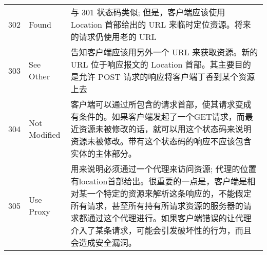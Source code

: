 \begin{longtable}[]{@{}cll@{}}
\begin{minipage}[t]{0.32\columnwidth}
302\strut
\end{minipage} & \begin{minipage}[t]{0.30\columnwidth}\raggedright\strut
Found\strut
\end{minipage} & \begin{minipage}[t]{0.30\columnwidth}\raggedright\strut
与 301 状态码类似; 但是，客户端应该使用 Location 首部给出的 URL
来临时定位资源。将来的请求仍使用老的 URL\strut
\end{minipage}\tabularnewline
\begin{minipage}[t]{0.32\columnwidth}\centering\strut
303\strut
\end{minipage} & \begin{minipage}[t]{0.30\columnwidth}\raggedright\strut
See Other\strut
\end{minipage} & \begin{minipage}[t]{0.30\columnwidth}\raggedright\strut
告知客户端应该用另外一个 URL 来获取资源。新的 URL 位于响应报文的
Location 首部。其主要目的是允许 POST
请求的响应将客户端丁香到某个资源上去\strut
\end{minipage}\tabularnewline
\begin{minipage}[t]{0.32\columnwidth}\centering\strut
304\strut
\end{minipage} & \begin{minipage}[t]{0.30\columnwidth}\raggedright\strut
Not Modified\strut
\end{minipage} & \begin{minipage}[t]{0.30\columnwidth}\raggedright\strut
客户端可以通过所包含的请求首部，使其请求变成有条件的。如果客户端发起了一个GET请求，而最近资源未被修改的话，就可以用这个状态码来说明资源未被修改。带有这个状态码的响应不应该包含实体的主体部分。\strut
\end{minipage}\tabularnewline
\begin{minipage}[t]{0.32\columnwidth}\centering\strut
305\strut
\end{minipage} & \begin{minipage}[t]{0.30\columnwidth}\raggedright\strut
Use Proxy\strut
\end{minipage} & \begin{minipage}[t]{0.30\columnwidth}\raggedright\strut
用来说明必须通过一个代理来访问资源;
代理的位置有location首部给出。很重要的一点是，客户端是相对某一个特定的资源来解析这条响应的，不能假定所有请求，甚至所有持有所请求资源的服务器的请求都通过这个代理进行。如果客户端错误的让代理介入了某条请求，可能会引发破坏性的行为，而且会造成安全漏洞。\strut
\end{minipage}\tabularnewline

\end{longtable}
